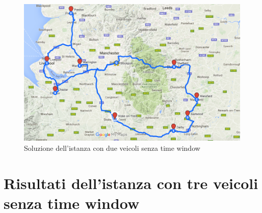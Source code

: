 		\begin{figure}[H]
			\centering
			\includegraphics[keepaspectratio=true, width=14cm]{img/mappa_soluzione_2.png}
			\caption{Soluzione dell'istanza con due veicoli senza time window}
			\label{fig:map_soluzione_2}
		\end{figure}

	\section{Risultati dell’istanza con tre veicoli senza time window}
	\label{sec:istanza_tre_veicoli_no_time_window}


